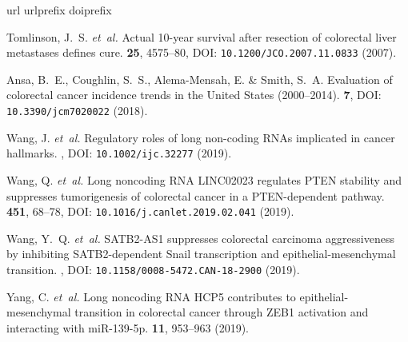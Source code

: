 \documentclass[fleqn,10pt]{wlscirep}
\begin{document}
\begin{thebibliography}{34}
\expandafter\ifx\csname url\endcsname\relax
  \def\url#1{\texttt{#1}}\fi
\expandafter\ifx\csname urlprefix\endcsname\relax\def\urlprefix{URL }\fi
\expandafter\ifx\csname doiprefix\endcsname\relax\def\doiprefix{DOI: }\fi
\providecommand{\bibinfo}[2]{#2}
\providecommand{\eprint}[2][]{\url{#2}}

\bibinfo{author}{Tomlinson, J.~S.} \emph{et~al.}
\newblock \bibinfo{journal}{\bibinfo{title}{Actual 10-year survival after resection of colorectal liver metastases defines cure}}.
 \textbf{\bibinfo{volume}{25}}, \bibinfo{pages}{4575--80}, \doiprefix\url{10.1200/JCO.2007.11.0833} (\bibinfo{year}{2007}).

\bibinfo{author}{Ansa, B.~E.}, \bibinfo{author}{Coughlin, S.~S.}, \bibinfo{author}{Alema-Mensah, E.} \& \bibinfo{author}{Smith, S.~A.}
\newblock \bibinfo{journal}{\bibinfo{title}{Evaluation of colorectal cancer incidence trends in the United States (2000--2014)}}.
 \textbf{\bibinfo{volume}{7}}, \doiprefix\url{10.3390/jcm7020022} (\bibinfo{year}{2018}).

\bibinfo{author}{Wang, J.} \emph{et~al.}
\newblock \bibinfo{journal}{\bibinfo{title}{Regulatory roles of long non-coding RNAs implicated in cancer hallmarks}}.
, \doiprefix\url{10.1002/ijc.32277} (\bibinfo{year}{2019}).

\bibinfo{author}{Wang, Q.} \emph{et~al.}
\newblock \bibinfo{journal}{\bibinfo{title}{Long noncoding RNA LINC02023 regulates PTEN stability and suppresses tumorigenesis of colorectal cancer in a PTEN-dependent pathway}}.
 \textbf{\bibinfo{volume}{451}}, \bibinfo{pages}{68--78}, \doiprefix\url{10.1016/j.canlet.2019.02.041} (\bibinfo{year}{2019}).

\bibinfo{author}{Wang, Y.~Q.} \emph{et~al.}
\newblock \bibinfo{journal}{\bibinfo{title}{SATB2-AS1 suppresses colorectal carcinoma aggressiveness by inhibiting SATB2-dependent Snail transcription and epithelial-mesenchymal transition}}.
, \doiprefix\url{10.1158/0008-5472.CAN-18-2900} (\bibinfo{year}{2019}).

\bibinfo{author}{Yang, C.} \emph{et~al.}
\newblock \bibinfo{journal}{\bibinfo{title}{Long noncoding RNA HCP5 contributes to epithelial-mesenchymal transition in colorectal cancer through ZEB1 activation and interacting with miR-139-5p}}.
 \textbf{\bibinfo{volume}{11}}, \bibinfo{pages}{953--963} (\bibinfo{year}{2019}).


\end{thebibliography}
\end{document}
